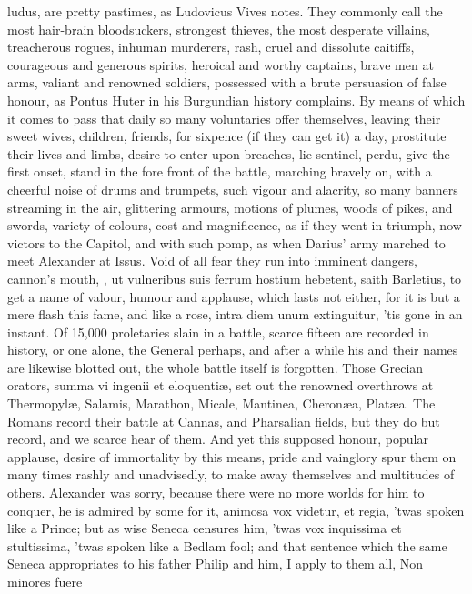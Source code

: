 {ludus, are pretty pastimes, as Ludovicus Vives notes. They
commonly call the most hair-brain bloodsuckers, strongest thieves, the
most desperate villains, treacherous rogues, inhuman murderers, rash,
cruel and dissolute caitiffs, courageous and generous spirits, heroical
and worthy captains, brave men at arms, valiant and renowned
soldiers, possessed with a brute persuasion of false honour, as Pontus
Huter in his Burgundian history complains. By means of which it comes
to pass that daily so many voluntaries offer themselves, leaving their
sweet wives, children, friends, for sixpence (if they can get it) a
day, prostitute their lives and limbs, desire to enter upon breaches,
lie sentinel, perdu, give the first onset, stand in the fore front of
the battle, marching bravely on, with a cheerful noise of drums and
trumpets, such vigour and alacrity, so many banners streaming in the
air, glittering armours, motions of plumes, woods of pikes, and swords,
variety of colours, cost and magnificence, as if they went in triumph,
now victors to the Capitol, and with such pomp, as when Darius' army
marched to meet Alexander at Issus. Void of all fear they run into
imminent dangers, cannon's mouth, \etc{}, ut vulneribus suis ferrum
hostium hebetent, saith Barletius, to get a name of valour, humour
and applause, which lasts not either, for it is but a mere flash this
fame, and like a rose, intra diem unum extinguitur, 'tis gone in an
instant. Of 15,000 proletaries slain in a battle, scarce fifteen are
recorded in history, or one alone, the General perhaps, and after a
while his and their names are likewise blotted out, the whole battle
itself is forgotten. Those Grecian orators, summa vi ingenii et
eloquenti\ae{}, set out the renowned overthrows at Thermopyl\ae{}, Salamis,
Marathon, Micale, Mantinea, Cheron\ae{}a, Plat\ae{}a. The Romans record their
battle at Cannas, and Pharsalian fields, but they do but record, and we
scarce hear of them. And yet this supposed honour, popular applause,
desire of immortality by this means, pride and vainglory spur them on
many times rashly and unadvisedly, to make away themselves and
multitudes of others. Alexander was sorry, because there were no more
worlds for him to conquer, he is admired by some for it, animosa vox
videtur, et regia, 'twas spoken like a Prince; but as wise Seneca
censures him, 'twas vox inquissima et stultissima, 'twas spoken like a
Bedlam fool; and that sentence which the same Seneca appropriates
to his father Philip and him, I apply to them all, Non minores fuere
}
